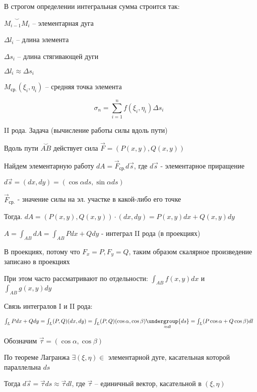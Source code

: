 \documentclass[12pt]{article}
\begin{document}
    \Nota В строгом определении интегральная сумма строится так:

    $\overset{\smile}{M_{i-1}M_i}$ -- элементарная дуга

    $\Delta l_i$ -- длина элемента

    $\Delta s_i$ -- длина стягивающей дуги

    $\Delta l_i \approx \Delta s_i$

    $M_{\text{ср.}}(\xi_i, \eta_i)$ -- средняя точка элемента

    \[\sigma_n = \sum_{i = 1}^n f(\xi_i, \eta_i) \Delta s_i\]

    \hypertarget{curvilinearintegralofsecondkind}{}

    II рода. Задача (вычисление работы силы вдоль пути)

    Вдоль пути $\overset{\smile}{AB}$ действует сила $\overrightarrow{F} = (P(x, y), Q(x, y))$

    Найдем элементарную работу $dA = \overrightarrow{F}_{\text{ср.}} d\overrightarrow{s}$, где $d\overrightarrow{s}$ - элементарное приращение

    $d\overrightarrow{s} = (dx, dy) = (\cos\alpha ds, \sin\alpha ds)$

    $\overrightarrow{F}_{\text{ср.}}$ - значение силы на эл. участке в какой-либо его точке

    Тогда. $dA = (P(x, y), Q(x, y)) \cdot (dx, dy) = P(x, y)dx + Q(x, y)dy$

    $A = \int_{AB} dA = \int_{AB} Pdx + Qdy$ - интеграл II рода (в проекциях)

    \Nota В проекциях, потому что $F_x = P, F_y = Q$, таким образом скалярное произведение записано в проекциях

    При этом часто рассматривают по отдельности: $\int_{AB} f(x, y) dx$ и $\int_{AB} g(x, y) dy$

    \hypertarget{connectionbetweencurvilinearintegrals}{}

    \Nota Связь интегралов I и II рода:

    $\int_L Pdx + Qdy = \int_L (P, Q)(dx, dy) = \int_L (P, Q) (\cos\alpha, \cos\beta) \underset{\approx dl}{\undergroup{ds}} =
    \int_L (P\cos\alpha + Q\cos\beta)dl$

    Обозначим $\vec{\tau} = (\cos\alpha, \cos\beta)$

    По теореме Лагранжа $\exists (\xi, \eta) \in$ элементарной дуге, касательная которой параллельна $ds$

    Тогда $d\vec{s} = \vec{\tau}ds \approx \vec{\tau}dl$, где $\vec{\tau}$ -- единичный вектор, касательной в $(\xi, \eta)$
\end{document}
